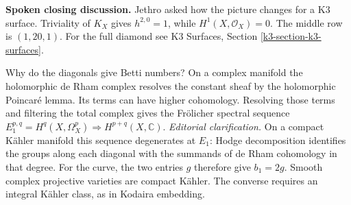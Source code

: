 \medskip\noindent
\textbf{Spoken closing discussion.}
Jethro asked how the picture changes for
a K3 surface. Triviality of $K_X$ gives
$h^{2,0}=1$, while $H^1(X,\mathcal O_X)=0$.
The middle row is $(1,20,1)$. For the full
diamond see K3 Surfaces, Section
\ref{k3-section-k3-surfaces}.

Why do the diagonals give Betti numbers?
On a complex manifold the holomorphic
de Rham complex resolves the constant
sheaf by the holomorphic Poincar\'e lemma.
Its terms can have higher cohomology.
Resolving those terms and filtering the
total complex gives the Fr\"olicher
spectral sequence
$
E_1^{p,q}=H^q(X,\Omega_X^p)
\Longrightarrow H^{p+q}(X,\mathbb C).
$
\emph{Editorial clarification.}
On a compact K\"ahler manifold this
sequence degenerates at $E_1$: Hodge
decomposition identifies the groups along
each diagonal with the summands of de Rham
cohomology in that degree. For the curve,
the two entries $g$ therefore give
$b_1=2g$. Smooth complex projective
varieties are compact K\"ahler. The
converse requires an integral K\"ahler
class, as in Kodaira embedding.





